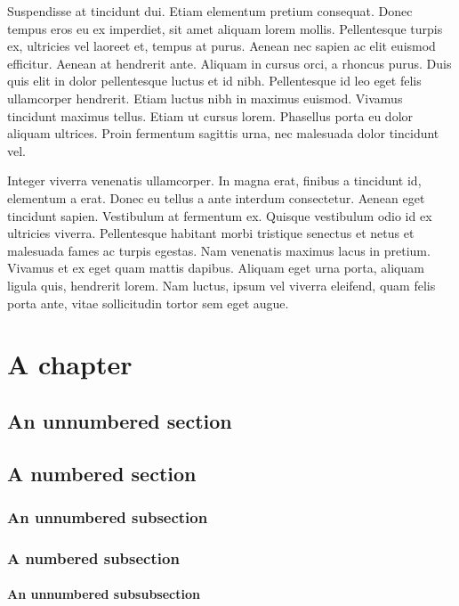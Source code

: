 \documentclass{abe}
\begin{document}
Suspendisse at tincidunt dui. Etiam elementum pretium consequat. Donec tempus eros eu ex imperdiet, sit amet aliquam lorem mollis. Pellentesque turpis ex, ultricies vel laoreet et, tempus at purus. Aenean nec sapien ac elit euismod efficitur. Aenean at hendrerit ante. Aliquam in cursus orci, a rhoncus purus. Duis quis elit in dolor pellentesque luctus et id nibh. Pellentesque id leo eget felis ullamcorper hendrerit. Etiam luctus nibh in maximus euismod. Vivamus tincidunt maximus tellus. Etiam ut cursus lorem. Phasellus porta eu dolor aliquam ultrices. Proin fermentum sagittis urna, nec malesuada dolor tincidunt vel.

Integer viverra venenatis ullamcorper. In magna erat, finibus a tincidunt id, elementum a erat. Donec eu tellus a ante interdum consectetur. Aenean eget tincidunt sapien. Vestibulum at fermentum ex. Quisque vestibulum odio id ex ultricies viverra. Pellentesque habitant morbi tristique senectus et netus et malesuada fames ac turpis egestas. Nam venenatis maximus lacus in pretium. Vivamus et ex eget quam mattis dapibus. Aliquam eget urna porta, aliquam ligula quis, hendrerit lorem. Nam luctus, ipsum vel viverra eleifend, quam felis porta ante, vitae sollicitudin tortor sem eget augue.

\mainmatter%

\chapter{A chapter}
\label{ch:1}
\section*{An unnumbered section}
\section{A numbered section}
\label{se:1.1}
\subsection*{An unnumbered subsection}
\subsection{A numbered subsection}
\label{ss:1.1.1}
\subsubsection*{An unnumbered subsubsection}
\end{document}
